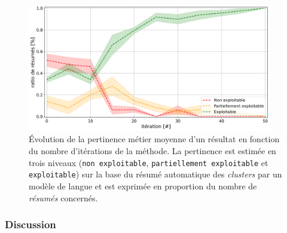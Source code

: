 			\begin{figure}[!htb]
				\centering
				\includegraphics[width=0.95\textwidth]{figures/etude-pertinence-llm-check-resume-annotation-favori}
				\caption{Évolution de la pertinence métier moyenne d'un résultat en fonction du nombre d'itérations de la méthode.
				La pertinence est estimée en trois niveaux (\texttt{non exploitable}, \texttt{partiellement exploitable} et \texttt{exploitable}) sur la base du résumé automatique des \textit{clusters} par un modèle de langue et est exprimée en proportion du nombre de \textit{résumés} concernés.}
				\label{figure:4.4.3-ETUDE-PERTINENCE-RESUME-AUTOMATIQUE}
			\end{figure}

		\subsubsection{Discussion}
		
			
	
